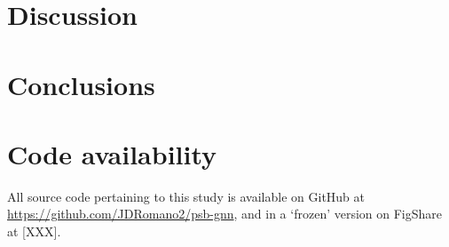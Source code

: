 \documentclass{ws-procs11x85}
\begin{document}
\section{Discussion}

\section{Conclusions}

\section{Code availability}
All source code pertaining to this study is available on GitHub at \url{https://github.com/JDRomano2/psb-gnn}, and in a `frozen' version on FigShare at [XXX].



\end{document}
